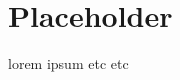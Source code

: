 \documentclass{article}
\begin{document}
\author{Ryan Piazza}


\section{Placeholder}

lorem ipsum etc etc
\end{document}
